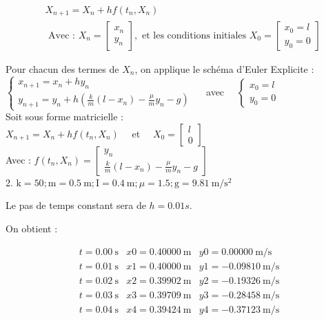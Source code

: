 \documentclass[10pt]{article}
\begin{document}
\[
\begin{aligned}
& X_{n+1}=X_{n}+h f\left(t_{n}, X_{n}\right) \\
& \text { Avec : } X_{n}=\left[\begin{array}{l}
x_{n} \\
y_{n}
\end{array}\right], \text { et les conditions initiales } X_{0}=\left[\begin{array}{l}
x_{0}=l \\
y_{0}=0
\end{array}\right]
\end{aligned}
\]

Pour chacun des termes de \(X_{n}\), on applique le schéma d'Euler Explicite :\\
\(\left\{\begin{array}{c}x_{n+1}=x_{n}+h y_{n} \\ y_{n+1}=y_{n}+h\left(\frac{k}{m}\left(l-x_{n}\right)-\frac{\mu}{m} y_{n}-g\right)\end{array} \quad\right.\) avec \(\quad\left\{\begin{array}{l}x_{0}=l \\ y_{0}=0\end{array}\right.\)\\
Soit sous forme matricielle :\\
\(X_{n+1}=X_{n}+h f\left(t_{n}, X_{n}\right) \quad\) et \(\quad X_{0}=\left[\begin{array}{l}l \\ 0\end{array}\right]\)\\
Avec : \(f\left(t_{n}, X_{n}\right)=\left[\begin{array}{c}y_{n} \\ \frac{k}{m}\left(l-x_{n}\right)-\frac{\mu}{m} y_{n}-g\end{array}\right]\)\\
2. \(\mathrm{k}=50 ; \mathrm{m}=0.5 \mathrm{~m} ; \mathrm{I}=0.4 \mathrm{~m} ; \mu=1.5 ; \mathrm{g}=9.81 \mathrm{~m} / \mathrm{s}^{2}\)

Le pas de temps constant sera de \(h=0.01 s\).

On obtient :

\[
\begin{array}{lll}
t=0.00 \mathrm{~s} & x 0=0.40000 \mathrm{~m} & y 0=0.00000 \mathrm{~m} / \mathrm{s} \\
t=0.01 \mathrm{~s} & x 1=0.40000 \mathrm{~m} & y 1=-0.09810 \mathrm{~m} / \mathrm{s} \\
t=0.02 \mathrm{~s} & x 2=0.39902 \mathrm{~m} & y 2=-0.19326 \mathrm{~m} / \mathrm{s} \\
t=0.03 \mathrm{~s} & x 3=0.39709 \mathrm{~m} & y 3=-0.28458 \mathrm{~m} / \mathrm{s} \\
t=0.04 \mathrm{~s} & x 4=0.39424 \mathrm{~m} & y 4=-0.37123 \mathrm{~m} / \mathrm{s}
\end{array}
\]
\end{document}
